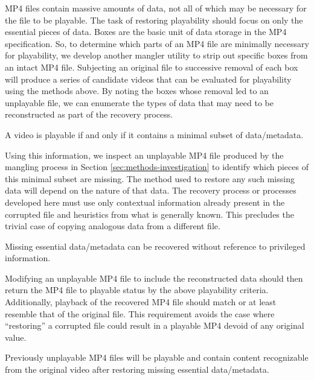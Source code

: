 MP4 files contain massive amounts of data, not all of which may be necessary for the file to be playable. The task of restoring playability should focus on only the essential pieces of data. Boxes are the basic unit of data storage in the MP4 specification. So, to determine which parts of an MP4 file are minimally necessary for playability, we develop another mangler utility to strip out specific boxes from an intact MP4 file. Subjecting an original file to successive removal of each box will produce a series of candidate videos that can be evaluated for playability using the methods above. By noting the boxes whose removal led to an unplayable file, we can enumerate the types of data that may need to be reconstructed as part of the recovery process.

\begin{hypothesis}
    \label{hyp:min-data}
    A video is playable if and only if it contains a minimal subset of data/metadata.
\end{hypothesis}

Using this information, we inspect an unplayable MP4 file produced by the mangling process in Section \ref{sec:methods-investigation} to identify which pieces of this minimal subset are missing. The method used to restore any such missing data will depend on the nature of that data. The recovery process or processes developed here must use only contextual information already present in the corrupted file and heuristics from what is generally known. This precludes the trivial case of copying analogous data from a different file.

\begin{hypothesis}
    \label{hyp:recovery-possible}
    Missing essential data/metadata can be recovered without reference to privileged information.
\end{hypothesis}

Modifying an unplayable MP4 file to include the reconstructed data should then return the MP4 file to playable status by the above playability criteria. Additionally, playback of the recovered MP4 file should match or at least resemble that of the original file. This requirement avoids the case where ``restoring'' a corrupted file could result in a playable MP4 devoid of any original value.

\begin{hypothesis}
    \label{hyp:recovered-playable}
    Previously unplayable MP4 files will be playable and contain content recognizable from the original video after restoring missing essential data/metadata.
\end{hypothesis}

